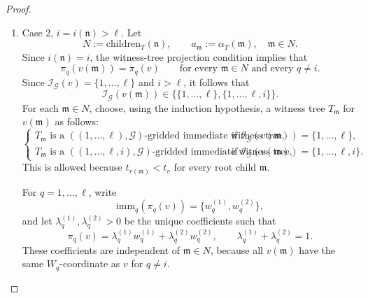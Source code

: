 \documentclass[10pt]{amsart}
\theoremstyle{plain}
\theoremstyle{definition}
\providecommand{\cG}[0]{\ensuremath{\mathcal G}\xspace}
\providecommand{\cI}[0]{\ensuremath{\mathcal I}\xspace}
\providecommand{\imm}[0]{\ensuremath{\mathrm{imm}}\xspace}
\newcommand{\fn}{\mathfrak{n}}
\begin{document}
\begin{proof}
\begin{enumerate}[1.]
\begin{enumerate}
\[
v(\operatorname{root}(T'))=v,
\qquad
i(\operatorname{root}(T'))=1.
\]

We verify that:
\[
\sum_{\fn' \in C_0} \alpha_T(\fn') v(\fn')  + \sum_{\fn' \in C_1}\sum_{\fn''} \alpha_T(\fn') \alpha_{T_{\fn'}}(\fn'')v(\fn'') 
= 
\sum_{\fn' \in C_0} \alpha_T(\fn') v(\fn') +\sum_{\fn' \in C_1} \alpha_T(\fn') v(\fn') = v,
\]
and
\[
\sum_{\fn' \in C_0} \alpha_T(\fn')  + \sum_{\fn' \in C_1}\sum_{\fn''} \alpha_T(\fn') \alpha_{T_{\fn'}}(\fn'')
= 
\sum_{\fn' \in C_0} \alpha_T(\fn')  +\sum_{\fn' \in C_1} \alpha_T(\fn') = 1.
\]

It is easy to check that the tree $T'$ constructed above is a $(\Pi,\cG)$-gridded witness tree for $v$. However, it might still violate the immediacy 
property at the root. 
We now apply Lemma~\ref{lem:root-immediacy-repair} to obtain 
a $(\Pi,\cG)$-gridded immediate witness tree for $v$. This completes
Case~\ref{itemlabel:proof:prop:gridded-witness:1.a.i}.

            \item 
            \label{itemlabel:proof:prop:gridded-witness:1.a.ii}
                Case 2, $i = i(\mathfrak{n}) > \ell $.
Let
\[
        N:=\mathrm{children}_T(\mathfrak{n}), \qquad a_{\mathfrak{m}}:=\alpha_T(\mathfrak{m}),\quad \mathfrak{m} \in N.
\]
Since \(i(\mathfrak{n})=i\), the witness-tree projection condition implies that
\[
        \pi_q(v(\mathfrak{m}))=\pi_q(v)
        \qquad\text{for every }\mathfrak{m} \in N\text{ and every }q\neq i.
\]
Since \(\cI_{\cG}(v)=\{1,\ldots,\ell\}\) and \(i>\ell\), it follows that
\[
        \cI_{\cG}(v(\mathfrak{m}))\in
        \bigl\{\{1,\ldots,\ell\},\{1,\ldots,\ell,i\}\bigr\}.
\]
For each \(\mathfrak{m} \in N\), choose, using the induction hypothesis, a witness tree \(T_{\mathfrak{m}}\) for
\(v(\mathfrak{m})\) as follows:
\[
\begin{cases}
T_{\mathfrak{m}} \text{ is a }((1,\ldots,\ell),\cG)\text{-gridded immediate witness tree},
&\text{if } \cI_{\cG}(v(\mathfrak{m}))=\{1,\ldots,\ell\},\\[2mm]
T_{\mathfrak{m}} \text{ is a }((1,\ldots,\ell,i),\cG)\text{-gridded immediate witness tree},
&\text{if } \cI_{\cG}(v(\mathfrak{m}))=\{1,\ldots,\ell,i\}.
\end{cases}
\]
This is allowed because \(t_{v(\mathfrak{m})}<t_v\) for every root child \(\mathfrak{m}\).

For \(q=1,\ldots,\ell\), write
\[
        \imm_q(\pi_q(v))=\{w_q^{(1)},w_q^{(2)}\},
\]
and let \(\lambda_q^{(1)},\lambda_q^{(2)}>0\) be the unique coefficients such that
\[
        \pi_q(v)
        =
        \lambda_q^{(1)} w_q^{(1)}
        +
        \lambda_q^{(2)} w_q^{(2)},
        \qquad
        \lambda_q^{(1)}+\lambda_q^{(2)}=1.
\]
These coefficients are independent of \(\mathfrak{m}\in N\), because all \(v(\mathfrak{m})\) have the same
\(W_q\)-coordinate as \(v\) for \(q\neq i\).


\end{enumerate}
\end{enumerate}
\end{proof}
\end{document}
